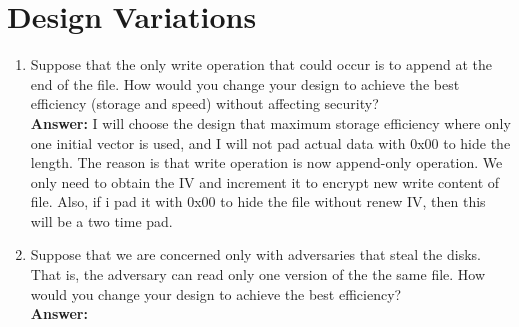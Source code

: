 \documentclass[a4paper,10pt]{article}
\begin{document}
\section{Design Variations}
\begin{enumerate}
  \item  Suppose that the only write operation that could occur is to append at the end of the file. How would you change your design to achieve the best efficiency (storage and speed) without affecting security?
  \\
  \textbf{Answer:} I will choose the design that maximum storage efficiency where only one initial vector is used, and I will not pad actual data with 0x00 to hide the length. The reason is that write operation is now append-only operation. We only need to obtain the IV and increment it to encrypt new write content of file. Also, if i pad it with 0x00 to hide the file without renew IV, then this will be a two time pad.
  \item Suppose that we are concerned only with adversaries that steal the disks. That is, the adversary can read only one version of the the same file. How would you change your design to achieve the best efficiency?
  \\
  \textbf{Answer: }


\end{enumerate}
\end{document}
